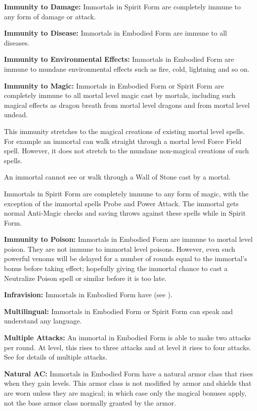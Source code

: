 \begin{multicols*}{2}
\textbf{Immunity to Damage:} Immortals in Spirit Form are completely immune to any form of damage or attack.

\textbf{Immunity to Disease:} Immortals in Embodied Form are immune to all diseases.

\textbf{Immunity to Environmental Effects:} Immortals in Embodied Form are immune to mundane environmental effects such as fire, cold, lightning and so on.

\textbf{Immunity to Magic:} Immortals in Embodied Form or Spirit Form are completely immune to all mortal level magic cast by mortals, including such magical effects as dragon breath from mortal level dragons and  from mortal level undead.

This immunity stretches to the magical creations of existing mortal level spells. For example an immortal can walk straight through a mortal level Force Field spell. However, it does not stretch to the mundane non-magical creations of such spells.

An immortal cannot see or walk through a Wall of Stone cast by a mortal.

Immortals in Spirit Form are completely immune to any form of magic, with the exception of the immortal spells Probe and Power Attack. The immortal gets normal Anti-Magic checks and saving throws against these spells while in Spirit Form.

\textbf{Immunity to Poison:} Immortals in Embodied Form are immune to mortal level poison. They are not immune to immortal level poisons. However, even such powerful venoms will be delayed for a number of rounds equal to the immortal’s  bonus before taking effect; hopefully giving the immortal chance to cast a Neutralize Poison spell or similar before it is too late.

\textbf{Infravision:} Immortals in Embodied Form have  (see ).

\textbf{Multilingual:} Immortals in Embodied Form or Spirit Form can speak and understand any language.

\textbf{Multiple Attacks:} An immortal in Embodied Form is able to make two attacks per round. At  level, this rises to three attacks and at  level it rises to four attacks. See  for details of multiple attacks.

\textbf{Natural AC:} Immortals in Embodied Form have a natural armor class that rises when they gain levels. This armor class is not modified by armor and shields that are worn unless they are magical; in which case only the magical bonuses apply, not the base armor class normally granted by the armor.


\end{multicols*}
